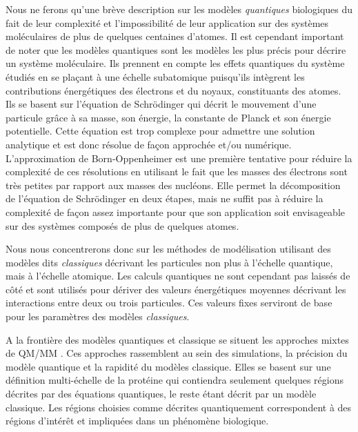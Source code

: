 Nous ne ferons qu'une brève description sur les modèles \textit{quantiques} biologiques du fait de leur complexité et l'impossibilité de leur application sur des systèmes moléculaires de plus de quelques centaines d'atomes. Il est cependant important de noter que les modèles quantiques sont les modèles les plus précis pour décrire un système moléculaire. Ils prennent en compte les effets quantiques du système étudiés en se plaçant à une échelle subatomique puisqu'ils intègrent les contributions énergétiques des électrons et du noyaux, constituants des atomes. Ils se basent sur l'équation de Schrödinger \cite{schrodinger1926undulatory} qui décrit le mouvement d'une particule grâce à sa masse, son énergie, la constante de Planck et son énergie potentielle. Cette équation est trop complexe pour admettre une solution analytique et est donc résolue de façon approchée et/ou numérique. L'approximation de Born-Oppenheimer \cite{born1927quantentheorie} est une première tentative pour réduire la complexité de ces résolutions en utilisant le fait que les masses des électrons sont très petites par rapport aux masses des nucléons. Elle permet la décomposition de l'équation de Schrödinger en deux étapes, mais ne suffit pas à réduire la complexité de façon assez importante pour que son application soit envisageable sur des systèmes composés de plus de quelques atomes.

Nous nous concentrerons donc sur les méthodes de modélisation utilisant des modèles dits \textit{classiques} décrivant les particules non plus à l'échelle quantique, mais à l'échelle atomique. Les calculs quantiques ne sont cependant pas laissés de côté et sont utilisés pour dériver des valeurs énergétiques moyennes décrivant les interactions entre deux ou trois particules. Ces valeurs fixes serviront de base pour les paramètres des modèles \textit{classiques}.

A la frontière des modèles quantiques et classique se situent les approches mixtes de QM/MM \cite{warshel1976theoretical}. Ces approches rassemblent au sein des simulations, la précision du modèle quantique et la rapidité du modèles classique. Elles se basent sur une définition multi-échelle de la protéine qui contiendra seulement quelques régions décrites par des équations quantiques, le reste étant décrit par un modèle classique. Les régions choisies comme décrites quantiquement correspondent à des régions d'intérêt et impliquées dans un phénomène biologique.

